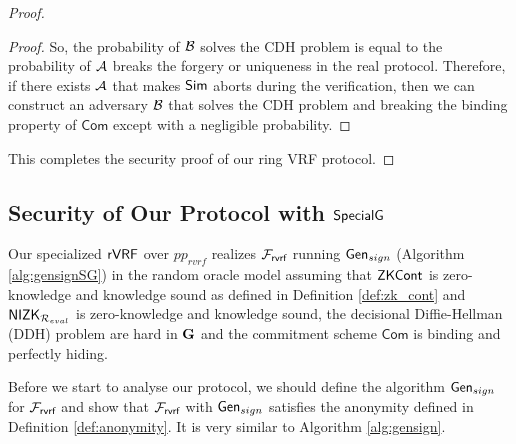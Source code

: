 \begin{proof}
\begin{proof}
			So, the probability of $ \mathcal{B} $ solves the CDH problem is equal to the probability of $ \mathcal{A} $ breaks the forgery or uniqueness in the real protocol. Therefore,  if there exists $ \mathcal{A} $ that makes $ \mathsf{Sim}$ aborts during the verification, then we can construct an adversary $ \mathcal{B} $ that solves the CDH problem and breaking the binding property of $ \mathsf{Com} $ except with a negligible probability.
			
			
				  
		\end{proof}
		This completes the security proof of our ring VRF protocol.\eprint{ \qed}{}
	\end{proof}


\subsection{Security of Our Protocol with $ {\mathsf{SpecialG}} $}
\begin{theorem}
	Our specialized $ {\mathsf{rVRF}} $   over  $ pp_{rvrf} $ realizes $ \mathcal{F}_{\textsf{rvrf}} $ running $ \mathsf{Gen}_{sign} $ (Algorithm \ref{alg:gensignSG}) \cite{canetti1,canetti2} in the random oracle model assuming that ${\mathsf{ZKCont}} $ is zero-knowledge and knowledge sound as defined in Definition \ref{def:zk_cont} and $ {\mathsf{NIZK}}_{\mathcal{R}_{eval}} $ is zero-knowledge and knowledge sound, the decisional Diffie-Hellman (DDH) problem are hard in $ {\mathbf{G}}  $  and the commitment scheme $ \mathsf{Com} $ is binding and perfectly hiding. 
\end{theorem}

Before we start to analyse our protocol, we should define the algorithm $ \mathsf{Gen}_{sign} $  for $ \mathcal{F}_{\textsf{rvrf}} $ and show that $ \mathcal{F}_{\textsf{rvrf}} $ with $ \mathsf{Gen}_{sign} $ satisfies the anonymity defined in Definition \ref{def:anonymity}. It is very similar to Algorithm \ref{alg:gensign}.


